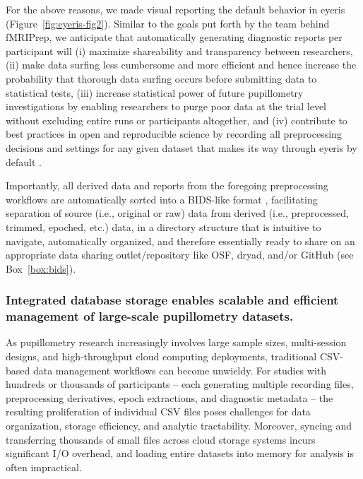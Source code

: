 For the above reasons, we made visual reporting the default behavior in eyeris (Figure~\ref{fig:eyeris-fig2}). Similar to the goals put forth by the team behind fMRIPrep, we anticipate that automatically generating diagnostic reports per participant will (i) maximize shareability and transparency between researchers, (ii) make data surfing less cumbersome and more efficient and hence increase the probability that thorough data surfing occurs before submitting data to statistical tests, (iii) increase statistical power of future pupillometry investigations by enabling researchers to purge poor data at the trial level without excluding entire runs or participants altogether, and (iv) contribute to best practices in open and reproducible science by recording all preprocessing decisions and settings for any given dataset that makes its way through eyeris by default \parencite{esteban2020analysis,esteban2019fmriprep,poldrack2019computational}.

Importantly, all derived data and reports from the foregoing preprocessing workflows are automatically sorted into a BIDS-like format \parencite{gorgolewski2016brain}, facilitating separation of source (i.e., original or raw) data from derived (i.e., preprocessed, trimmed, epoched, etc.) data, in a directory structure that is intuitive to navigate, automatically organized, and therefore essentially ready to share on an appropriate data sharing outlet/repository like OSF, dryad, and/or GitHub (see Box~\ref{box:bids}).

\subsubsection{Integrated database storage enables scalable and efficient management of large-scale pupillometry datasets.}
As pupillometry research increasingly involves large sample sizes, multi-session designs, and high-throughput cloud computing deployments, traditional CSV-based data management workflows can become unwieldy. For studies with hundreds or thousands of participants – each generating multiple recording files, preprocessing derivatives, epoch extractions, and diagnostic metadata – the resulting proliferation of individual CSV files poses challenges for data organization, storage efficiency, and analytic tractability. Moreover, syncing and transferring thousands of small files across cloud storage systems incurs significant I/O overhead, and loading entire datasets into memory for analysis is often impractical.

